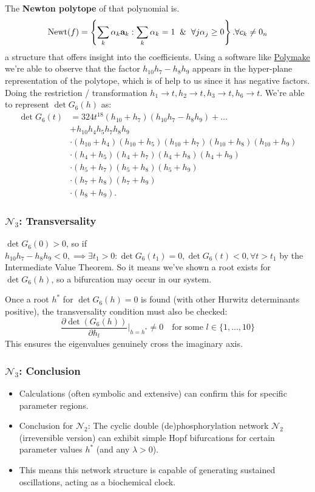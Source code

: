 \documentclass[aspectratio=169]{beamer}
\begin{document}
\begin{frame}
	The \textbf{Newton polytope} of that polynomial is.
	\[
		\mathrm{Newt}(f)=\left\{\sum_k\alpha_k\mathbf{a}_k:\sum_k\alpha_k=1 \And \forall j\alpha_j\geq0\right\}. \forall c_k \neq 0_n
	\]a structure that offers insight into the coefficients.
	Using a software like \href{https://polymake.org/doku.php/start}{Polymake} we're able to observe that the factor $	h_{10}h_7 - h_8 h_9$ appears in the hyper-plane representation of the polytope, which is of help to us since it has negative factors.
	Doing the restriction / transformation $	h_1\to t,h_2\to t,h_3\to t,h_6\to t.$ We're able to represent $\det G_6(h)$ as:
	\[
		\begin{aligned}
			\det G_6(t)
			&=324t^{18}(h_{10}+h_7)(h_{10}h_7-h_8h_9)+\ldots\\&+h_{10}h_4h_5h_7h_8h_9\\&\cdot(h_{10}+h_4)(h_{10}+h_5)(h_{10}+h_7)(h_{10}+h_8)(h_{10}+h_9)\\&\cdot(h_4+h_5)(h_4+h_7)(h_4+h_8)(h_4+h_9)\\&\cdot(h_5+h_7)(h_5+h_8)(h_5+h_9)\\&\cdot(h_7+h_8)(h_7+h_9)\\&\cdot(h_8+h_9).
		\end{aligned}
	\]
\end{frame}

\begin{frame}{\insertsectionhead}
	\frametitle{$\mathcal{N}_3$: Transversality}
	$\det G_6(0) > 0$, so if $h_{10}h_{7} - h_{8}h_{9} < 0, \implies \exists t_1 > 0 : \det G_6(t_1) = 0, \det G_6(t) < 0, \forall t > t_1$ by the \alert{Intermediate Value Theorem}.
	So it means we've shown a root exists for $\det G_6(h)$, so a bifurcation may occur in our system.

	Once a root $h^*$ for $\det G_6(h)=0$ is found (with other Hurwitz determinants positive), the transversality condition must also be checked:
	$$ \frac{\partial \det(G_6(h))}{\partial h_l} \bigg|_{h=h^*} \neq 0 \quad \text{for some } l \in \{1, \dots, 10\} $$
	This ensures the eigenvalues genuinely cross the imaginary axis.
\end{frame}

\begin{frame}
	\frametitle{$\mathcal{N}_3$: Conclusion}
	\begin{itemize}
		\item Calculations (often symbolic and extensive) can confirm this for specific parameter regions.
		\item \alert{Conclusion for $\mathcal{N}_2$}: The cyclic double (de)phosphorylation network $\mathcal{N}_2$ (irreversible version) \alert{can exhibit simple Hopf bifurcations} for certain parameter values $h^*$ (and any $\lambda > 0$).
		\item This means this network structure is capable of generating sustained oscillations, acting as a biochemical clock.
	\end{itemize}
\end{frame}
\end{document}
